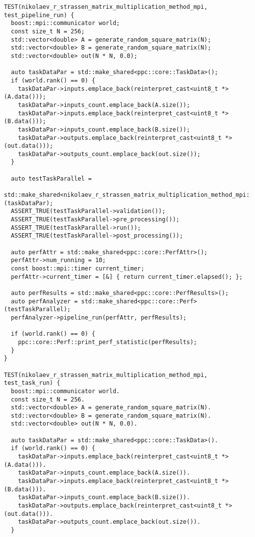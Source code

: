 \documentclass[a4paper,12pt]{article}
\begin{document}
\begin{lstlisting}[caption={Тесты функций из perf\_tests/main.cpp}]
TEST(nikolaev_r_strassen_matrix_multiplication_method_mpi, test_pipeline_run) {
  boost::mpi::communicator world;
  const size_t N = 256;
  std::vector<double> A = generate_random_square_matrix(N);
  std::vector<double> B = generate_random_square_matrix(N);
  std::vector<double> out(N * N, 0.0);
  
  auto taskDataPar = std::make_shared<ppc::core::TaskData>();
  if (world.rank() == 0) {
    taskDataPar->inputs.emplace_back(reinterpret_cast<uint8_t *>(A.data()));
    taskDataPar->inputs_count.emplace_back(A.size());
    taskDataPar->inputs.emplace_back(reinterpret_cast<uint8_t *>(B.data()));
    taskDataPar->inputs_count.emplace_back(B.size());
    taskDataPar->outputs.emplace_back(reinterpret_cast<uint8_t *>(out.data()));
    taskDataPar->outputs_count.emplace_back(out.size());
  }
  
  auto testTaskParallel =
      std::make_shared<nikolaev_r_strassen_matrix_multiplication_method_mpi::StrassenMatrixMultiplicationParallel>(taskDataPar);
  ASSERT_TRUE(testTaskParallel->validation());
  ASSERT_TRUE(testTaskParallel->pre_processing());
  ASSERT_TRUE(testTaskParallel->run());
  ASSERT_TRUE(testTaskParallel->post_processing());
  
  auto perfAttr = std::make_shared<ppc::core::PerfAttr>();
  perfAttr->num_running = 10;
  const boost::mpi::timer current_timer;
  perfAttr->current_timer = [&] { return current_timer.elapsed(); };
  
  auto perfResults = std::make_shared<ppc::core::PerfResults>();
  auto perfAnalyzer = std::make_shared<ppc::core::Perf>(testTaskParallel);
  perfAnalyzer->pipeline_run(perfAttr, perfResults);
  
  if (world.rank() == 0) {
    ppc::core::Perf::print_perf_statistic(perfResults);
  }
}

TEST(nikolaev_r_strassen_matrix_multiplication_method_mpi, test_task_run) {
  boost::mpi::communicator world.
  const size_t N = 256.
  std::vector<double> A = generate_random_square_matrix(N).
  std::vector<double> B = generate_random_square_matrix(N).
  std::vector<double> out(N * N, 0.0).
  
  auto taskDataPar = std::make_shared<ppc::core::TaskData>().
  if (world.rank() == 0) {
    taskDataPar->inputs.emplace_back(reinterpret_cast<uint8_t *>(A.data())).
    taskDataPar->inputs_count.emplace_back(A.size()).
    taskDataPar->inputs.emplace_back(reinterpret_cast<uint8_t *>(B.data())).
    taskDataPar->inputs_count.emplace_back(B.size()).
    taskDataPar->outputs.emplace_back(reinterpret_cast<uint8_t *>(out.data())).
    taskDataPar->outputs_count.emplace_back(out.size()).
  }
  

\end{lstlisting}
\end{document}
